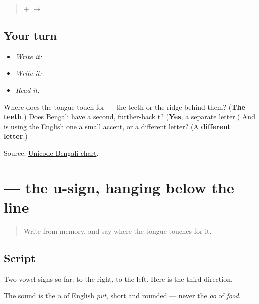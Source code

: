 \begin{quote}
\textbf{} + \textbf{} $\to$ \textbf{}
\end{quote}

\subsection*{Your turn}
\begin{itemize}
\raggedright
  \item \emph{Write it:} 
  \item \emph{Write it:} 
  \item \emph{Read it:} 
\end{itemize}

\begin{tcolorbox}[breakable,colback=teal!4,colframe=teal!35!black,title={Before you move on}]
Where does the tongue touch for \textbf{} — the teeth or the ridge behind them? (\textbf{The teeth}.) Does Bengali have a second, further-back t? (\textbf{Yes}, a separate letter.) And is using the English one a small accent, or a different letter? (A \textbf{different letter}.)

Source: \href{https://www.unicode.org/charts/PDF/U0980.pdf}{Unicode Bengali chart}.
\end{tcolorbox}
\section[\texorpdfstring{\bn{ু} (-u)}{ু (-u)}]{ — the u-sign, hanging below the line}

\label{lesson:BN-W02-u-matra}



\begin{quote}
Write \textbf{} from memory, and say where the tongue touches for it.
\end{quote}

\subsection*{Script}
Two vowel signs so far: \textbf{} to the right, \textbf{} to the left. Here is the third direction.

\begin{quote}
\end{quote}

The sound is the \emph{u} of English \emph{put}, short and rounded — never the \emph{oo} of \emph{food}.


